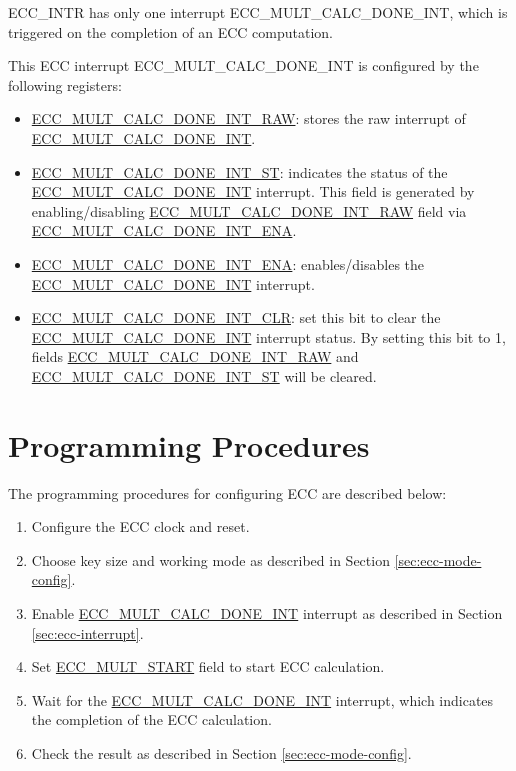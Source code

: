 \documentclass[main\_\_EN.tex]{subfiles}
\begin{document}
ECC\_INTR has only one interrupt \label{int:ECCMULTCALCDONEINT}ECC\_MULT\_CALC\_DONE\_INT, which is triggered on the completion of an ECC computation.


This ECC interrupt ECC\_MULT\_CALC\_DONE\_INT is configured by the following registers:
\begin{itemize}
    \item \hyperref[fielddesc:ECCMULTCALCDONEINTRAW]{ECC\_MULT\_CALC\_DONE\_INT\_RAW}: stores the raw interrupt of \hyperref[int:ECCMULTCALCDONEINT]{ECC\_MULT\_CALC\_DONE\_INT}.
    \item \hyperref[fielddesc:ECCMULTCALCDONEINTST]{ECC\_MULT\_CALC\_DONE\_INT\_ST}: indicates the status of the \hyperref[int:ECCMULTCALCDONEINT]{ECC\_MULT\_CALC\_DONE\_INT} interrupt. This field is generated by enabling/disabling  \hyperref[fielddesc:ECCMULTCALCDONEINTRAW]{ECC\_MULT\_CALC\_DONE\_INT\_RAW} field via \hyperref[fielddesc:ECCMULTCALCDONEINTENA]{ECC\_MULT\_CALC\_DONE\_INT\_ENA}.
    \item \hyperref[fielddesc:ECCMULTCALCDONEINTENA]{ECC\_MULT\_CALC\_DONE\_INT\_ENA}: enables/disables the \hyperref[int:ECCMULTCALCDONEINT]{ECC\_MULT\_CALC\_DONE\_INT} interrupt.
    \item \hyperref[fielddesc:ECCMULTCALCDONEINTCLR]{ECC\_MULT\_CALC\_DONE\_INT\_CLR}: set this bit to clear the \hyperref[int:ECCMULTCALCDONEINT]{ECC\_MULT\_CALC\_DONE\_INT} interrupt status. By setting this bit to 1, fields \hyperref[fielddesc:ECCMULTCALCDONEINTRAW]{ECC\_MULT\_CALC\_DONE\_INT\_RAW} and  \hyperref[fielddesc:ECCMULTCALCDONEINTST]{ECC\_MULT\_CALC\_DONE\_INT\_ST} will be cleared.
\end{itemize}

\section{Programming Procedures}

The programming procedures for configuring ECC are described below:

\begin{enumerate}
    \item Configure the ECC clock and reset.
    \item Choose key size and working mode as described in Section \ref{sec:ecc-mode-config}.
    \item Enable \hyperref[int:ECCMULTCALCDONEINT]{ECC\_MULT\_CALC\_DONE\_INT} interrupt as described in Section \ref{sec:ecc-interrupt}.
    \item Set \hyperref[fielddesc:ECCMULTSTART]{ECC\_MULT\_START} field to start ECC calculation.
    \item Wait for the \hyperref[int:ECCMULTCALCDONEINT]{ECC\_MULT\_CALC\_DONE\_INT} interrupt, which indicates the completion of the ECC calculation.
    \item Check the result as described in Section \ref{sec:ecc-mode-config}.
\end{enumerate}
\end{document}

